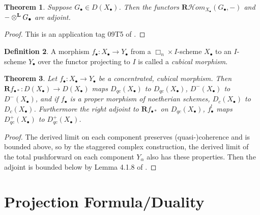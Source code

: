 \documentclass{amsart}
\newtheorem{theorem}{Theorem}
\theoremstyle{definition}
\newtheorem{definition}[theorem]{Definition}
\newcommand{\cHom}{\mathcal{H} \textit{om}}
\newcommand{\bR}{\textbf{R}}
\newcommand{\otimesL}{\otimes^{\bf L}}
\begin{document}
\begin{theorem}
	Suppose $G_\bullet \in D(X_\bullet)$. Then the functors $\bR \cHom_{X_\bullet}(G_\bullet, -)$ and $-\otimesL G_\bullet$ are adjoint.
\end{theorem}
\begin{proof}
	This is an application tag 09T5 of \cite{stacks}.
\end{proof}

\begin{definition}
	A morphism $f_\bullet : X_\bullet \rightarrow Y_\bullet$ from a $\Box_n \times I$-scheme $X_\bullet$ to an $I$-scheme $Y_\bullet$ over the functor projecting to $I$ is called a \textit{cubical morphism}.
\end{definition}

\begin{theorem}
	\label{thm:pushforwardbounds}
	Let $f_\bullet : X_\bullet \rightarrow Y_\bullet$ be a concentrated, cubical morphism.
	Then $\bR f_{\bullet *} : D(X_\bullet) \rightarrow D(X_\bullet)$ maps $D_{qc}(X_\bullet)$ to $D_{qc}(X_\bullet)$, $D^-(X_\bullet)$ to $D^-(X_\bullet)$, and if $f_\bullet$ is a proper morphism of noetherian schemes, $D_c(X_\bullet)$ to $D_c(X_\bullet)$.
	Furthermore the right adjoint to $\bR f_{\bullet *}$ on $D_{qc}(X_\bullet)$, $f_\bullet^!$ maps $D_{qc}^+(X_\bullet)$ to $D_{qc}^+(X_\bullet)$.
\end{theorem}
\begin{proof}
	The derived limit on each component preserves (quasi-)coherence and is bounded above, so by the staggered complex construction, the derived limit of the total pushforward on each component $Y_\alpha$ also has these properties.
	Then the adjoint is bounded below by Lemma 4.1.8 of \cite{Lipman2009}.
\end{proof}

\section{Projection Formula/Duality}
\end{document}
